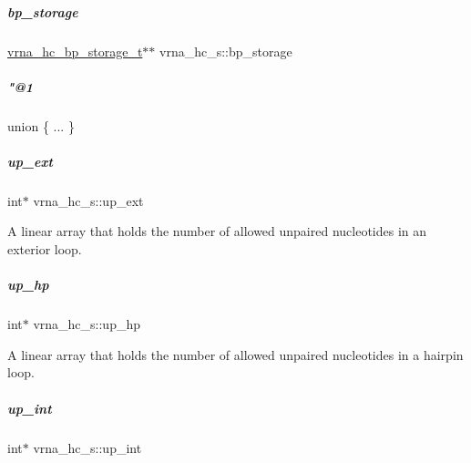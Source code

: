 \mbox{\label{group__hard__constraints_ab8760aed745e6d50e7982ff9a0c52ca9}} 
\subparagraph{\texorpdfstring{bp\+\_\+storage}{bp\_storage}}
{\footnotesize\ttfamily \mbox{\hyperlink{structvrna__hc__bp__storage__t}{vrna\+\_\+hc\+\_\+bp\+\_\+storage\+\_\+t}}$\ast$$\ast$ vrna\+\_\+hc\+\_\+s\+::bp\+\_\+storage}

\mbox{\label{group__hard__constraints_a0025a2ac95c18617b958d60ca5ab7e9f}} 
\subparagraph{\texorpdfstring{"@1}{@1}}
{\footnotesize\ttfamily union \{ ... \} }

\mbox{\label{group__hard__constraints_a60094038af04093b2fee9b883266ff75}} 
\subparagraph{\texorpdfstring{up\+\_\+ext}{up\_ext}}
{\footnotesize\ttfamily int$\ast$ vrna\+\_\+hc\+\_\+s\+::up\+\_\+ext}



A linear array that holds the number of allowed unpaired nucleotides in an exterior loop. 

\mbox{\label{group__hard__constraints_a853255558e7e7d9eb382ac142ac8de3d}} 
\subparagraph{\texorpdfstring{up\+\_\+hp}{up\_hp}}
{\footnotesize\ttfamily int$\ast$ vrna\+\_\+hc\+\_\+s\+::up\+\_\+hp}



A linear array that holds the number of allowed unpaired nucleotides in a hairpin loop. 

\mbox{\label{group__hard__constraints_a455f994af0ec892d84fee1bf60d14a81}} 
\subparagraph{\texorpdfstring{up\+\_\+int}{up\_int}}
{\footnotesize\ttfamily int$\ast$ vrna\+\_\+hc\+\_\+s\+::up\+\_\+int}



